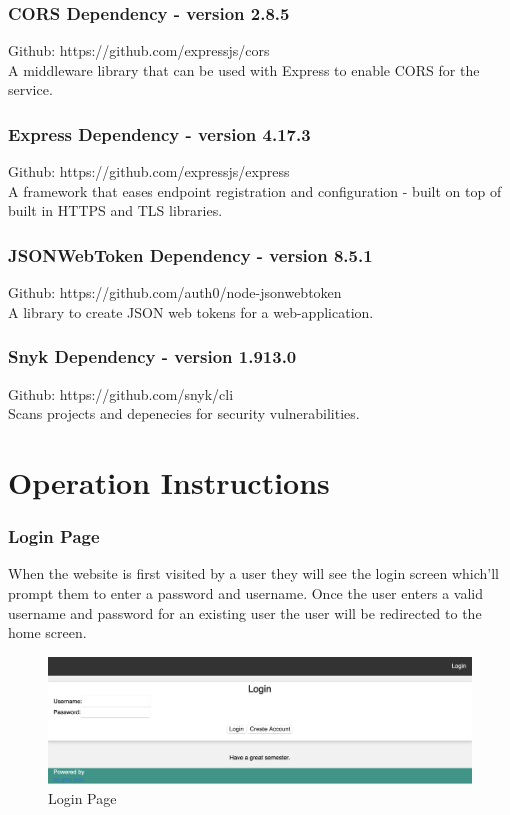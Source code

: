 \documentclass[12pt]{article}
\begin{document}
\subsubsection{CORS Dependency - version 2.8.5}
Github: https://github.com/expressjs/cors\\
A middleware library that can be used with Express to enable CORS for the service.

\subsubsection{Express Dependency - version 4.17.3}
Github: https://github.com/expressjs/express\\
A framework that eases endpoint registration and configuration - built on top of built in HTTPS and TLS libraries.

\subsubsection{JSONWebToken Dependency - version 8.5.1}
Github: https://github.com/auth0/node-jsonwebtoken\\
A library to create JSON web tokens for a web-application.

\subsubsection{Snyk Dependency - version 1.913.0}
Github: https://github.com/snyk/cli\\
Scans projects and depenecies for security vulnerabilities.
\newpage
\section{Operation Instructions}
\subsubsection{Login Page}
When the website is first visited by a user they will see the login screen which'll prompt them to 
enter a password and username. Once the user enters a valid username and password for an existing user the 
user will be redirected to the home screen.
\begin{figure}[h!]
    \includegraphics[width=\linewidth]{LOGIN.png}
    \caption{Login Page}
\end{figure}
\end{document}
